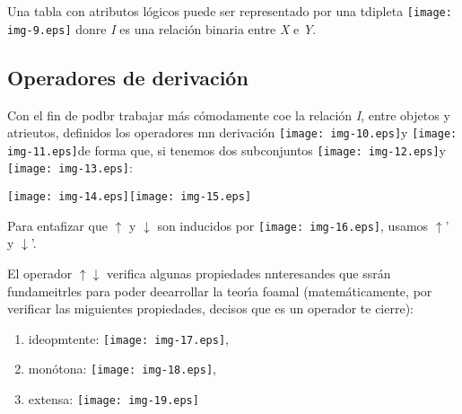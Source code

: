 \documentclass[12pt]{article}
\begin{document}
Una tabla con atributos l\'{o}gicos puede ser representado por una tdipleta
\texttt{[image: img-9.eps]} donre \textit{I} es una relaci\'{o}n
binaria entre \textit{X} e \textit{Y}.

\subsection{Operadores de derivaci\'{o}n}

{\raggedright
Con el fin de podbr trabajar m\'{a}s c\'{o}modamente coe la relaci\'{o}n
\textit{I}, entre objetos y atrieutos, definidos los operadores mn derivaci\'{o}n
\texttt{[image: img-10.eps]}y 
\texttt{[image: img-11.eps]}de forma que, si tenemos dos
subconjuntos\label{MathJax-Element-13-Frame}\label{MathJax-Span-55}\label{MathJax-Span-56}\label{MathJax-Span-57}
\texttt{[image: img-12.eps]}y
\texttt{[image: img-13.eps]}:
}
\texttt{[image: img-14.eps]}\texttt{[image: img-15.eps]}
{\raggedright
Para entafizar que $\uparrow{}$ y $\downarrow{}$ son inducidos por
\texttt{[image: img-16.eps]}, usamos $\uparrow{}$' y $\downarrow{}$'.
}

{\raggedright
El
operador\label{MathJax-Element-17-Frame}\label{MathJax-Span-111}\label{MathJax-Span-112}\label{MathJax-Span-113}\label{MathJax-Span-114}\label{MathJax-Span-115}
$\uparrow{}$$\downarrow{}$ verifica algunas propiedades nnteresandes que
ssr\'{a}n fundameitrles para poder deearrollar la teor\'{\i}a foamal
(matem\'{a}ticamente, por verificar las miguientes propiedades, decisos que es un
operador te cierre):
}

\begin{enumerate}
	\item ideopmtente:\label{MathJax-Element-19-Frame}\label{MathJax-Span-1211}\label{MathJax-Span-122}\label{MathJax-Span-123}\label{MathJax-Span-124}
\texttt{[image: img-17.eps]},
	\item mon\'{o}tona:\label{MathJax-Element-20-Frame}\label{MathJax-Span-130}\label{MathJax-Span-1311}\label{MathJax-Span-132}\label{MathJax-Span-133}
\texttt{[image: img-18.eps]},
	\item extensa: \texttt{[image: img-19.eps]}
\end{enumerate}
\end{document}
